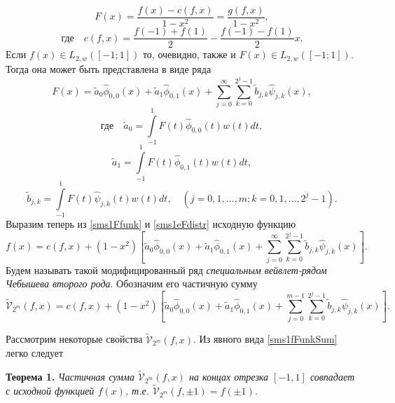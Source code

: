 \documentclass[12pt]{book}
\begin{document}
\begin{equation}
\label{sms1Ffunk}
F(x) = \frac{f(x)-c(f,x)}{1-x^2} = \frac{g(f,x)}{1-x^2},
\end{equation}
\begin{equation*}
\label{sms1af}
\text{где}\quad c(f,x) = \frac{f(-1) + f(1)}{2} - \frac{f(-1) - f(1)}{2} x.
\end{equation*}
Если $f(x) \in L_{2, w}([-1; 1])$ то, очевидно, также и $F(x) \in L_{2, w}([-1; 1])$. Тогда она может быть представлена в виде ряда
\begin{equation}
\label{sms1eFdistr}
F(x) = \tilde{a}_{0}\hat{\phi}_{0,0}(x) + \tilde{a}_{1}\hat{\phi}_{0,1}(x) + \sum\limits_{j=0}^{\infty} \sum\limits_{k=0}^{2^j-1} \tilde{b}_{j,k}\hat{\psi}_{j,k}(x),
\end{equation}
\begin{equation*}
\label{sms1efcoeffA0}
\text{где}\quad \tilde{a}_{0} = \int\limits_{-1}^{1} F(t)\hat{\phi}_{0,0}(t) w(t)dt,
\end{equation*}
\begin{equation*}
\label{sms1efcoeffA1}
\tilde{a}_{1} = \int\limits_{-1}^{1} F(t)\hat{\phi}_{0,1}(t) w(t) dt,
\end{equation*}
\begin{equation*}
\label{sms1efcoeffB}
\tilde{b}_{j,k} = \int\limits_{-1}^{1} F(t)\hat{\psi}_{j,k}(t) w(t) dt, \quad (j=0,1, \ldots, m; k = 0, 1, \ldots, 2^j-1).
\end{equation*}
Выразим теперь из \eqref{sms1Ffunk} и \eqref{sms1eFdistr} исходную функцию
\begin{equation*}
\label{sms1fFunk}
f(x)=
c(f,x)+(1-x^2) \left[ \tilde{a}_{0}\hat{\phi}_{0,0}(x) + \tilde{a}_{1}\hat{\phi}_{0,1}(x) + \sum\limits_{j=0}^{\infty} \sum\limits_{k=0}^{2^j-1} \tilde{b}_{j,k}\hat{\psi}_{j,k}(x) \right].
\end{equation*}
Будем называть такой модифицированный ряд \textit{специальным вейвлет-рядом Чебышева второго рода}. Обозначим его частичную сумму
\begin{equation}
\label{sms1fFunkSum}
\tilde{\mathcal{V}}_{2^m}(f,x)  = c(f,x)+(1-x^2) \left[ \tilde{a}_{0}\hat{\phi}_{0,0}(x) + \tilde{a}_{1}\hat{\phi}_{0,1}(x) + \sum\limits_{j=0}^{m-1} \sum\limits_{k=0}^{2^j-1} \tilde{b}_{j,k}\hat{\psi}_{j,k}(x) \right].
\end{equation}

\noindent Рассмотрим некоторые свойства $\tilde{\mathcal{V}}_{2^m}(f,x)$. Из явного вида \eqref{sms1fFunkSum} легко следует

\noindent\textbf{Теорема 1. }\textit{
Частичная сумма $\tilde{\mathcal{V}}_{2^m}(f,x)$ на концах отрезка $[-1,1]$ совпадает с исходной функцией $f(x)$, т.е. $\tilde{\mathcal{V}}_{2^m}(f,\pm1) = f(\pm1)$.
}
\end{document}
